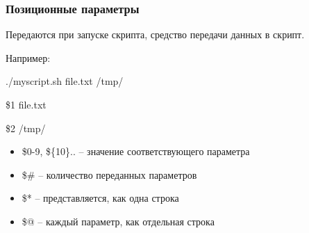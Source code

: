 \begin{frame}
	\frametitle{Позиционные параметры}

	Передаются при запуске скрипта, средство передачи данных в скрипт.

        Например: 

        ./myscript.sh file.txt /tmp/

        \$1 file.txt

        \$2 /tmp/
        
	\begin{itemize}
		\item \alert{ \$0-9, \$\{10\}}..  -- значение соответствующего параметра
		\item \alert{\$\#} -- количество переданных параметров
		\item \alert{\$*} -- представляется, как одна строка
		\item \alert{\$@} -- каждый параметр, как отдельная строка
	\end{itemize}

\end{frame}


%
%
%
%
%


%
%

